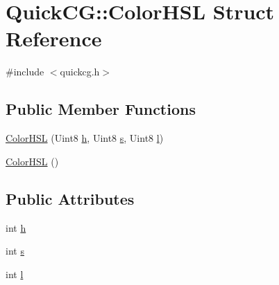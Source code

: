 \hypertarget{structQuickCG_1_1ColorHSL}{\section{Quick\-C\-G\-:\-:Color\-H\-S\-L Struct Reference}
\label{structQuickCG_1_1ColorHSL}
}


{\ttfamily \#include $<$quickcg.\-h$>$}

\subsection*{Public Member Functions}
\begin{DoxyCompactItemize}
\item 
\hyperlink{structQuickCG_1_1ColorHSL_af38324de505ec8bb6b0db73c8e87179c}{Color\-H\-S\-L} (Uint8 \hyperlink{structQuickCG_1_1ColorHSL_a22460cd9b83f6cfc658dfd4c6acb9dc1}{h}, Uint8 \hyperlink{structQuickCG_1_1ColorHSL_abf20406550a927b4afe96ddec60de577}{s}, Uint8 \hyperlink{structQuickCG_1_1ColorHSL_ab67c594a335b19305eee199fb64a5d61}{l})
\item 
\hyperlink{structQuickCG_1_1ColorHSL_a1517aa2b85f37af7e38429340cb9ef43}{Color\-H\-S\-L} ()
\end{DoxyCompactItemize}
\subsection*{Public Attributes}
\begin{DoxyCompactItemize}
\item 
int \hyperlink{structQuickCG_1_1ColorHSL_a22460cd9b83f6cfc658dfd4c6acb9dc1}{h}
\item 
int \hyperlink{structQuickCG_1_1ColorHSL_abf20406550a927b4afe96ddec60de577}{s}
\item 
int \hyperlink{structQuickCG_1_1ColorHSL_ab67c594a335b19305eee199fb64a5d61}{l}
\end{DoxyCompactItemize}


